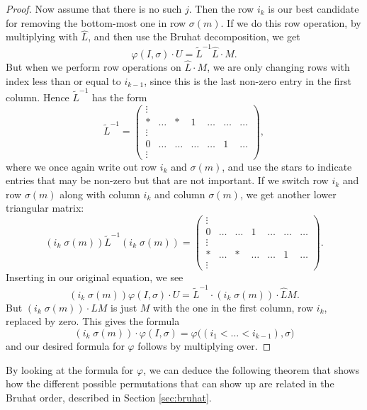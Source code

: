 \begin{proof}
  Now assume that there is no such $j$. Then the row $i_k$ is our best
  candidate for removing the bottom-most one in row $\sigma(m)$. If we
  do this row operation, by multiplying with $\widehat L$, and then
  use the
  Bruhat decomposition, we get
  \[ \varphi(I,\sigma)\cdot U = \widetilde{L}^{-1}\widehat{L} \cdot
  M. \]
  But when we perform row operations on $\widehat{L} \cdot M$, we are
  only changing rows with index less than or equal to $i_{k-1}$, since
  this is the last non-zero entry in the first column. Hence
  $\widetilde{L}^{-1}$
  has the form
  \[ \widetilde{L}^{-1} = 
  \begin{pmatrix}
    \vdots \\
    * & \dots & * & 1 & \dots & \dots & \dots \\
    \vdots \\
    0 & \dots & \dots & \dots & \dots & 1 & \dots \\
    \vdots
  \end{pmatrix},
  \]
  where we once again write out row $i_k$ and $\sigma(m)$, and use the
  stars to indicate entries that may be non-zero but that are not
  important.
  If we switch row $i_k$ and row $\sigma(m)$ along with column
  $i_k$ and column $\sigma(m)$, we get another lower triangular
  matrix:
  \[ (i_k \; \sigma(m)) \widetilde{L}^{-1} (i_k \; \sigma(m)) = 
  \begin{pmatrix}
    \vdots \\
    0 & \dots & \dots & 1 & \dots & \dots & \dots \\
    \vdots \\
    * & \dots & * & \dots & \dots & 1 & \dots \\
    \vdots
  \end{pmatrix}.\]
  Inserting in our original equation, we see
  \[ (i_k \; \sigma(m)) \varphi(I,\sigma) \cdot U = \widetilde{L}^{-1}
  \cdot (i_k \; \sigma(m)) \cdot \widehat{L} M. \]
  But $(i_k \; \sigma(m)) \cdot \widehat{L} M$ is just $M$ with the
  one in the first column, row $i_k$, replaced by zero. This gives the
  formula
  \[ (i_k \; \sigma(m)) \cdot \varphi(I,\sigma) =
  \varphi\big((i_1<\dots<i_{k-1}),\sigma\big) \]
  and our desired formula for $\varphi$ follows by multiplying over.
\end{proof}

By looking at the formula for $\varphi$, we can deduce the following
theorem that shows how the different possible permutations that can
show up are related in the Bruhat order, described in Section
\ref{sec:bruhat}.

